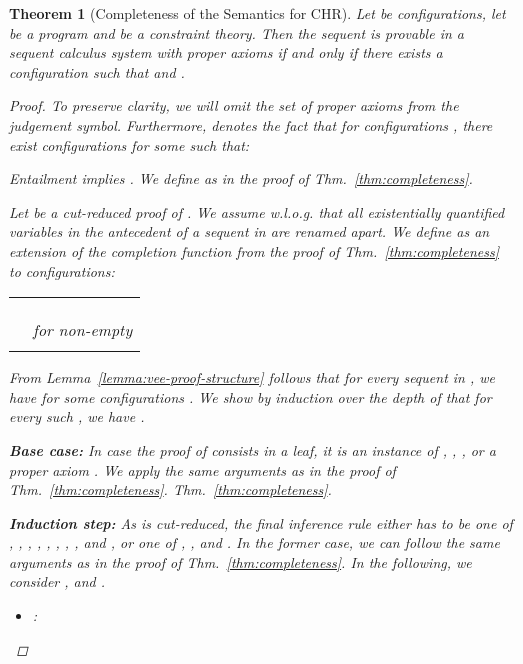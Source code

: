 \documentclass[acmtocl]{acmtrans2m}
\newtheorem{theorem}{Theorem}[section]
\begin{document}
\begin{theorem}[Completeness of the Semantics for CHR]
\label{thm:vee-completeness}
   Let  be configurations, let  be a program and  be a
   constraint theory. Then the sequent  is provable in a
   sequent calculus system with proper axioms 
   \emph{if and only if} there exists a configuration  such that
    and .

\begin{proof}
To preserve clarity, we will omit the set of proper axioms from the judgement
symbol. Furthermore,  denotes the fact that for configurations
,  there exist configurations  for some  such
that:
	
Entailment  implies . We define
 as in the proof of Thm.~\ref{thm:completeness}.

Let  be a cut-reduced proof of .
We assume w.l.o.g. that all existentially quantified variables
in the antecedent of a sequent in  are renamed apart. We define  as an
extension of the completion function from the proof
of Thm.~\ref{thm:completeness} to configurations:

	\medskip
	\begin{tabular}{l @{\hspace{1mm}  \hspace{1mm}} l}
	   &  \\
	   &  \\
	   &  \\
	   & 
	  	\quad for non-empty  \\
	   &  \\
	\end{tabular}

	\medskip
	From Lemma~\ref{lemma:vee-proof-structure} follows that for every
	sequent  in , we have
	 for some configurations . We
	show by induction over the depth of  that for every such , we have .

	\textbf{Base case:}
	In case the proof of  consists in a leaf, it is
	an instance of , , , or a proper axiom
	.
	We apply the same arguments as in the proof of Thm.~\ref{thm:completeness}.
	Thm.~\ref{thm:completeness}.

	\textbf{Induction step:}
	As  is cut-reduced, the final inference rule either has to be one of
	, , , , , ,
	, ,  and , or one of ,
	, and . In the former case, we can follow the same
	arguments as in the proof of Thm.~\ref{thm:completeness}. In the following,
	we consider ,  and .

	\begin{itemize}
	  \item :
		

\end{itemize}
\end{proof}
\end{theorem}
\end{document}
